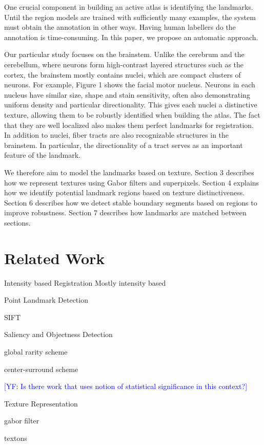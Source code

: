 \documentclass{llncs}
\newcommand{\authcmt}[2]{\textcolor{#1}{#2}}
\newcommand{\yoav}[1]{\authcmt{blue}{[YF: #1]}}
\begin{document}

One crucial component in building an active atlas is identifying the landmarks. Until the region models are trained with sufficiently many examples, the system must obtain the annotation in other ways. Having human labellers do the annotation is time-consuming. In this paper, we propose an automatic approach.

Our particular study focuses on the brainstem. Unlike the cerebrum and the cerebellum, where neurons form high-contrast layered structures such as the cortex, the brainstem mostly contains nuclei, which are compact clusters of neurons. For example, Figure 1 shows the facial motor nucleus. Neurons in each nucleus have similar size, shape and stain sensitivity, often also demonstrating uniform density and particular directionality. This gives each nuclei a distinctive texture, allowing them to be robustly identified when building the atlas. The fact that they are well localized also makes them perfect landmarks for registration. In addition to nuclei, fiber tracts are also recognizable structures in the brainstem. In particular, the directionality of a tract serves as an important feature of the landmark.

We therefore aim to model the landmarks based on texture. Section 3 describes how we represent textures using Gabor filters and superpixels. Section 4 explains how we identify potential landmark regions based on texture distinctiveness. Section 6 describes how we detect stable boundary segments based on regions to improve robustness. Section 7 describes how landmarks are matched between sections.

%
%

\section{Related Work}

\begin{description}

\item{Intensity based Registration}
Mostly intensity based


\item{Point Landmark Detection}

SIFT

\item{Saliency and Objectness Detection}

global rarity scheme

center-surround scheme

\yoav{Is there work that uses notion of statistical significance in
  this context?}

\item{Texture Representation}

gabor filter

textons


\end{description}
\end{document}
